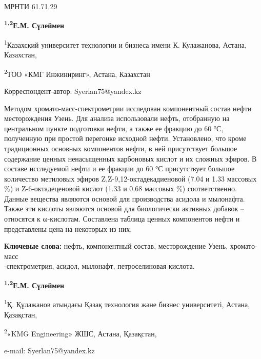 \newpage
МРНТИ 61.71.29


\begin{center}
{\bfseries \textsuperscript{1,2}Е.М. Сүлеймен}

\textsuperscript{1}Казахский университет технологии и бизнеса имени К.
Кулажанова, Астана, Казахстан,

\textsuperscript{2}ТОО «КМГ Инжиниринг», Астана, Казахстан
\end{center}
\envelope Корреспондент-автор: Syerlan75@yandex.kz

Методом хромато-масс-спектрометрии исследован компонентный состав нефти
месторождения Узень. Для анализа использовали нефть, отобранную на
центральном пункте подготовки нефти, а также ее фракцию до 60 °С,
полученную при простой перегонке исходной нефти. Установлено, что кроме
традиционных основных компонентов нефти, в ней присутствует большое
содержание ценных ненасыщенных карбоновых кислот и их сложных эфиров. В
составе исследуемой нефти и ее фракции до 60 °С присутствует большое
количество метиловых эфиров Z,Z-9,12-октадекадиеновой (7.04 и 1.33
массовых \%) и Z-6-октадеценовой кислот (1.33 и 0.68 массовых \%)
соответственно. Данные вещества являются основой для производства
асидола и мылонафта. Также эти кислоты являются основой для биологически
активных добавок -- относятся к ω-кислотам. Составлена таблица ценных
компонентов нефти и представлены цена на некоторых из них.

{\bfseries Ключевые слова:} нефть, компонентный состав, месторождение
Узень, хромато-масс\\-спектрометрия, асидол, мылонафт, петроселиновая
кислота.


\begin{center}
{\bfseries \textsuperscript{1,2}Е.М. Сүлеймен}

\textsuperscript{1}Қ. Құлажанов атындағы Қазақ технология және бизнес
университеті, Астана, Қазақстан,

\textsuperscript{2}«KMG Engineering» ЖШС, Астана, Қазақстан,

e-mail: Syerlan75@yandex.kz
\end{center}

